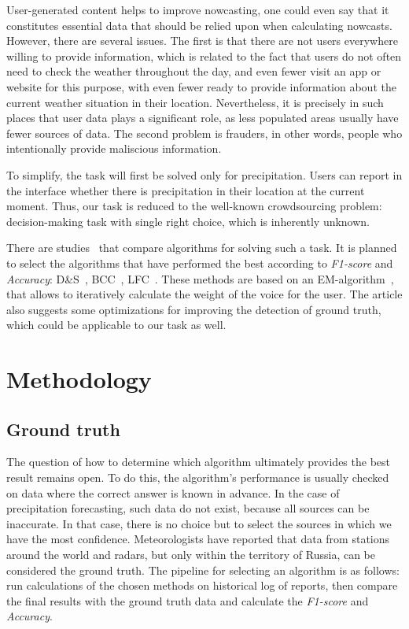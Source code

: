 \documentclass[conference]{IEEEtran}
\begin{document}
User-generated content helps to improve nowcasting, one could even say that it constitutes essential data that should be relied upon when calculating nowcasts. However, there are several issues. The first is that there are not users everywhere willing to provide information, which is related to the fact that users do not often need to check the weather throughout the day, and even fewer visit an app or website for this purpose, with even fewer ready to provide information about the current weather situation in their location. Nevertheless, it is precisely in such places that user data plays a significant role, as less populated areas usually have fewer sources of data. The second problem is frauders, in other words, people who intentionally provide maliscious information.

To simplify, the task will first be solved only for precipitation. Users can report in the interface whether there is precipitation in their location at the current moment. Thus, our task is reduced to the well-known crowdsourcing problem: decision-making task with single right choice, which is inherently unknown.

There are studies~\cite{zheng} that compare algorithms for solving such a task. It is planned to select the algorithms that have performed the best according to \textit{F1-score} and \textit{Accuracy}: D\&S~\cite{ds}, BCC~\cite{bcc}, LFC~\cite{lfc}. These methods are based on an EM-algorithm~\cite{em}, that allows to iteratively calculate the weight of the voice for the user. The article also suggests some optimizations for improving the detection of ground truth, which could be applicable to our task as well.

\section{Methodology}
\subsection{Ground truth}

The question of how to determine which algorithm ultimately provides the best result remains open. To do this, the algorithm's performance is usually checked on data where the correct answer is known in advance. In the case of precipitation forecasting, such data do not exist, because all sources can be inaccurate. In that case, there is no choice but to select the sources in which we have the most confidence. Meteorologists have reported that data from stations around the world and radars, but only within the territory of Russia, can be considered the ground truth. The pipeline for selecting an algorithm is as follows: run calculations of the chosen methods on historical log of reports, then compare the final results with the ground truth data and calculate the \textit{F1-score} and \textit{Accuracy}.
\end{document}
